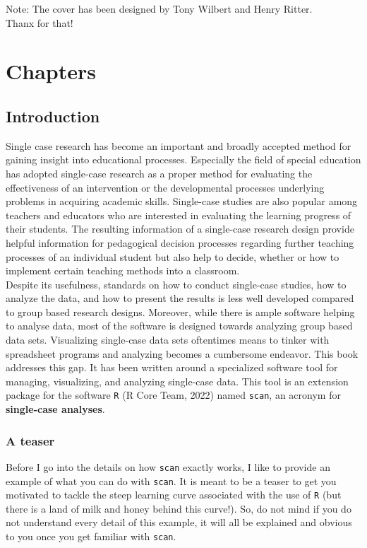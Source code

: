 \documentclass[
  letterpaper,
  DIV=11,
  numbers=noendperiod]{scrreprt}
\begin{document}
Note: The cover has been designed by Tony Wilbert and Henry Ritter.\\
Thanx for that!

\part{Chapters}

\hypertarget{introduction}{%
\chapter{Introduction}\label{introduction}}

Single case research has become an important and broadly accepted method
for gaining insight into educational processes. Especially the field of
special education has adopted single-case research as a proper method
for evaluating the effectiveness of an intervention or the developmental
processes underlying problems in acquiring academic skills. Single-case
studies are also popular among teachers and educators who are interested
in evaluating the learning progress of their students. The resulting
information of a single-case research design provide helpful information
for pedagogical decision processes regarding further teaching processes
of an individual student but also help to decide, whether or how to
implement certain teaching methods into a classroom.\\
Despite its usefulness, standards on how to conduct single-case studies,
how to analyze the data, and how to present the results is less well
developed compared to group based research designs. Moreover, while
there is ample software helping to analyse data, most of the software is
designed towards analyzing group based data sets. Visualizing
single-case data sets oftentimes means to tinker with spreadsheet
programs and analyzing becomes a cumbersome endeavor. This book
addresses this gap. It has been written around a specialized software
tool for managing, visualizing, and analyzing single-case data. This
tool is an extension package for the software \texttt{R} (R Core Team,
2022) named \texttt{scan}, an acronym for \textbf{single-case analyses}.

\hypertarget{a-teaser}{%
\section{A teaser}\label{a-teaser}}

Before I go into the details on how \texttt{scan} exactly works, I like
to provide an example of what you can do with \texttt{scan}. It is meant
to be a teaser to get you motivated to tackle the steep learning curve
associated with the use of \texttt{R} (but there is a land of milk and
honey behind this curve!). So, do not mind if you do not understand
every detail of this example, it will all be explained and obvious to
you once you get familiar with \texttt{scan}.
\end{document}
